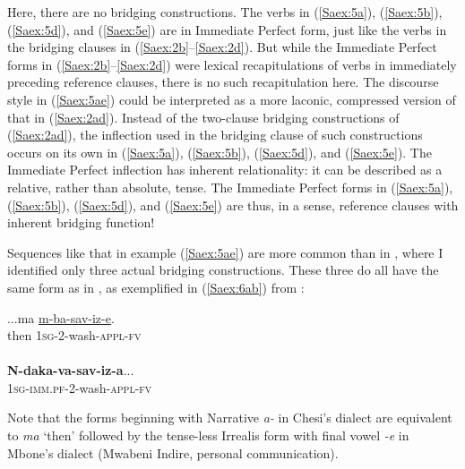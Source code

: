 \documentclass[output=paper]{LSP/langsci}
\begin{document}
Here, there are no bridging constructions. The verbs in (\ref{Saex:5a}), (\ref{Saex:5b}), (\ref{Saex:5d}), and (\ref{Saex:5e}) are in Immediate Perfect form, just like the verbs in the bridging clauses in (\ref{Saex:2b}--\ref{Saex:2d}). But while the Immediate Perfect forms in (\ref{Saex:2b}--\ref{Saex:2d}) were lexical recapitulations of verbs in immediately preceding reference clauses, there is no such recapitulation here. The discourse style in (\ref{Saex:5ae}) could be interpreted as a more laconic, compressed version of that in (\ref{Saex:2ad}). Instead of the two-clause bridging constructions of (\ref{Saex:2ad}), the inflection used in the bridging clause of such constructions occurs on its own in (\ref{Saex:5a}), (\ref{Saex:5b}), (\ref{Saex:5d}), and (\ref{Saex:5e}). The Immediate Perfect inflection has inherent relationality: it can be described as a relative, rather than absolute, tense. The Immediate Perfect forms in (\ref{Saex:5a}), (\ref{Saex:5b}), (\ref{Saex:5d}), and (\ref{Saex:5e}) are thus, in a sense, reference clauses with inherent bridging function!

Sequences like that in example (\ref{Saex:5ae}) are more common than  in \citet{Mbone2014}, where I identified only three actual bridging constructions. These three do all have the same form as in \citet{Chesi2014}, as exemplified in (\ref{Saex:6ab}) from \citet{Mbone2014}:


\begin{exe}
\ex \label{Saex:6ab}
\begin{xlist}
\ex \label{Saex:6a}
\gll ...ma  \underline{m-ba-sav-iz-e}. \\
then  \textsc{1sg}-\textsc{2}-wash-\textsc{appl-fv}\\
\glt {}\\
\ex \label{Saex:6b}
\gll \textbf{N-daka-va-sav-iz-a}...\\     	       
    \textsc{1sg-imm.pf-2}-wash-\textsc{appl-fv}\\
\glt {} 
\end{xlist}
\end{exe}

Note that the forms beginning with Narrative \textit{a-} in Chesi’s dialect are equivalent to \textit{ma} `then' followed by the tense-less Irrealis form with final vowel \textit{-e} in Mbone’s dialect (Mwabeni Indire, personal communication).
%
\end{document}
